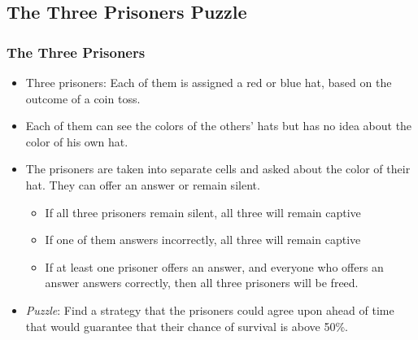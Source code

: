\subsection{The Three Prisoners Puzzle}

\begin{frame}
\frametitle{The Three Prisoners}

\begin{itemize}[<+->]

\item Three prisoners: Each of them is assigned a red or blue hat, based on the outcome of a coin toss.
\item Each of them can see the colors of the others' hats but has no idea about the color of his own hat.
\item The prisoners are taken into separate cells and asked about the color of their hat. They can offer an answer or remain silent. 
\medskip
\begin{itemize}
\item If all three prisoners remain silent, all three will remain captive %
\item If one of them answers incorrectly, all three will remain captive %
\item If at least one prisoner offers an answer, and everyone who offers an answer answers correctly, then all three prisoners will be freed.
\end{itemize}
\medskip
\item \emph{Puzzle}: Find a strategy that the prisoners could agree upon ahead of time that would guarantee that their chance of survival is above 50\%.

\end{itemize}
\end{frame}

